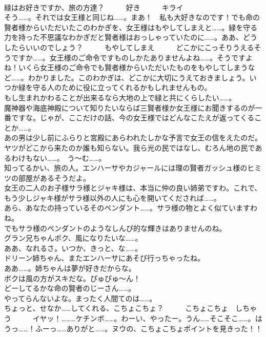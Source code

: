 \documentclass[8pt]{extreport}
\begin{document}
\begin{CJK}{UTF8}{min}
\\	緑はお好きですか、旅の方達？　　　好き　　　キライ	
\\	そう……。それでは女王様と同じね……。まあ！　私も大好きなのです！でも命の賢者様からいただいたこのわかぎを、女王様はもやしてしまえと……。緑を守る力を持った不思議なわかぎだと賢者様はおっしゃっていたのに……。ああ、どうしたらいいのでしょう？　　　もやしてしまえ　　　どこかにこっそりうえるそうですか……。女王様のご命令ですものしかたありませんよね……。そうですよね！いくら女王様のご命令でも賢者様からいただいたものをもやしてしまうなど……。わかりました。このわかぎは、どこかに大切にうえておきましょう。いつか緑を守る人のために役に立ってくれるかもしれませんもの。	
\\	もし生まれかわることが出来るなら大地の上で緑と共にくらしたい……。	
\\	魔神器や海底神殿について知りたいならば三賢者様か女王様にお聞きするのが一番ですな。じゃが、ここだけの話、今の女王様ではどんなこたえが返ってくることか……。	
\\	あの男は少し前にふらりと宮殿にあらわれたしかな予言で女王の信をえたのだ。ヤツがどこから来たのか誰も知らない。我ら光の民ではなし、むろん地の民であるわけもない……。　う～む……。	
\\	知ってるかい、旅の人。エンハーサやカジャールには理の賢者ガッシュ様のヒミツの部屋があるそうだよ。	
\\	女王の二人のお子様サラ様とジャキ様は、本当に仲の良い姉弟ですわ。これで、もう少しジャキ様がサラ様以外の人にも心を開いてくだされば……。	
\\	あら、あなたの持っているそのペンダント……。サラ様の物とよく似ていますわね。	
\\	でもサラ様のペンダントのようなしんぴ的な輝きはありませんのね。	
\\	グラン兄ちゃんボク、風になりたいな……。	
\\	ああ、なれるさ。いつか、きっと、な……。	
\\	ドリーン姉ちゃん、またエンハーサにあそび行っちゃったね。	
\\	ああ……。姉ちゃんは夢が好きだからな。	
\\	ボクは風の方がスキだな。ぴゅぴゅ～ん！	
\\	どーしてるかな命の賢者のじーさん……。	
\\	やってらんないよな。まったく人間てのは……。	
\\	ちょっと、せなか……してくれる、こちょこちょ？　　　こちょこちょ　しちゃう　　　イヤッ！………ケチンボ……。わーい、やったー。うん……そこそこ……。はうっ……！ふーっ……ありがと……。ヌウの、こちょこちょポイントを見きった！！	

\end{CJK}
\end{document}

